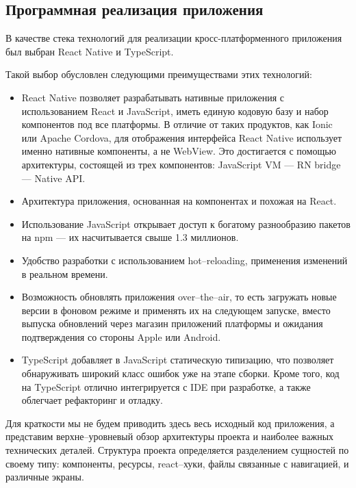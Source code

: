 \subsection{Программная реализация приложения}
В качестве стека технологий для реализации кросс-платформенного приложения был выбран React Native и TypeScript. 

Такой выбор обусловлен следующими преимуществами этих технологий:
\begin{itemize}
	\item React Native позволяет разрабатывать нативные приложения с использованием React и JavaScript, иметь единую кодовую базу и набор компонентов под все платформы. В отличие от таких продуктов, как Ionic или Apache Cordova, для отображения интерфейса React Native использует именно нативные компоненты, а не WebView. Это достигается с помощью архитектуры, состоящей из трех компонентов: JavaScript VM --- RN bridge --- Native API.
	\item Архитектура приложения, основанная на компонентах и похожая на React.
	\item Использование JavaScript открывает доступ к богатому разнообразию пакетов на npm --- их насчитывается свыше 1.3 миллионов.
	\item Удобство разработки с использованием hot--reloading, применения изменений в реальном времени.
	\item Возможность обновлять приложения over--the--air, то есть загружать новые версии в фоновом режиме и применять их на следующем запуске, вместо выпуска обновлений через магазин приложений платформы и ожидания подтверждения со стороны Apple или Android.
	\item TypeScript добавляет в JavaScript статическую типизацию, что позволяет обнаруживать широкий класс ошибок уже на этапе сборки. Кроме того, код на TypeScript отлично интегрируется с IDE при разработке, а также облегчает рефакторинг и отладку.
\end{itemize}

Для краткости мы не будем приводить здесь весь исходный код приложения, а представим верхне--уровневый обзор архитектуры проекта и наиболее важных технических деталей.
Структура проекта определяется разделением сущностей по своему типу: компоненты, ресурсы, react--хуки, файлы связанные с навигацией, и различные экраны. %

